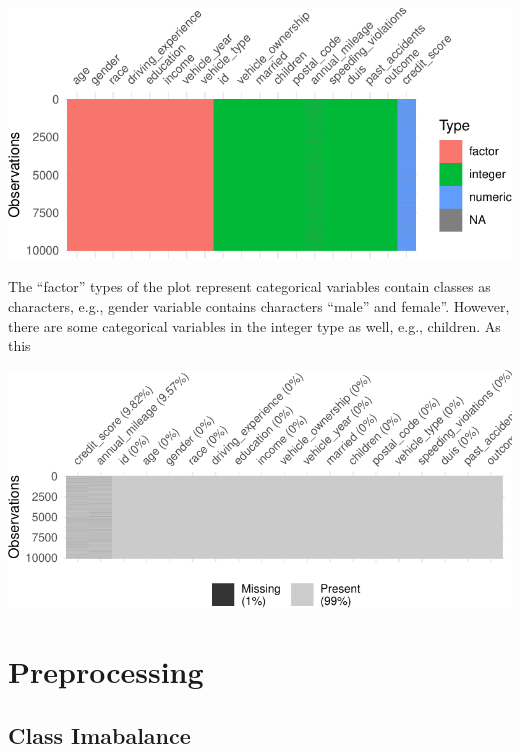 \documentclass{article}
\begin{document}
\begin{center}\includegraphics{report_files/figure-latex/unnamed-chunk-3-1} \end{center}

The ``factor'' types of the plot represent categorical variables contain
classes as characters, e.g., gender variable contains characters
``male'' and female''. However, there are some categorical variables in
the integer type as well, e.g., children. As this

\normalsize

\begin{center}\includegraphics{report_files/figure-latex/unnamed-chunk-4-1} \end{center}

\hypertarget{preprocessing}{%
\section{Preprocessing}\label{preprocessing}}

\hypertarget{class-imabalance}{%
\subsection{\texorpdfstring{Class Imabalance
\label{subsec:imbalance}}{Class Imabalance }}\label{class-imabalance}}
\end{document}
